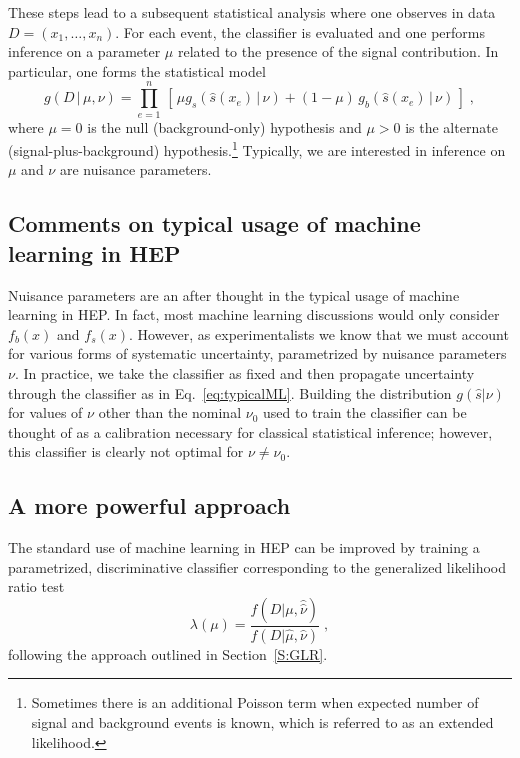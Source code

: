 \documentclass[11pt, oneside]{article}   	%
\begin{document}
These steps lead to a subsequent statistical analysis where one observes in data $D=(x_1, \dots, x_n)$. For each event, the classifier is evaluated and one performs inference on a parameter $\mu$ related to the presence of the signal contribution. In particular, one forms the statistical model
\begin{equation}\label{eq:typicalML}
g( D \,|\, \mu, \nu) = \prod_{e=1}^n \, \left[\, \mu g_s( \hat s(x_e) \, |\,  \nu)  + (1-\mu)\, g_b( \hat s(x_e) \,|\, \nu) \,\right] \; ,
\end{equation}
where $\mu=0$ is the null (background-only) hypothesis and $\mu>0$ is the alternate (signal-plus-background) hypothesis.\footnote{Sometimes there is an additional Poisson term when expected number of signal and background events is known, which is referred to as an extended likelihood.} Typically, we are interested in inference on $\mu$ and $\nu$ are nuisance parameters.

\subsection{Comments on typical usage of machine learning in HEP}

Nuisance parameters are an after thought in the typical usage of machine learning in HEP. In fact, most machine learning discussions would only consider $f_b(x)$ and $f_s(x)$. However, as experimentalists we know that we must account for various forms of systematic uncertainty, parametrized by nuisance parameters $\nu$. In practice, we take the classifier as fixed and then propagate uncertainty through the classifier as in Eq.~\ref{eq:typicalML}. Building the distribution $g(\hat s|\nu)$ for values of $\nu$ other than the nominal $\nu_0$ used to train the classifier can be thought of as a calibration necessary for classical statistical inference; however, this classifier is clearly not optimal for $\nu \ne \nu_0$.

\subsection{A more powerful  approach}

The standard use of machine learning in HEP can be improved by training a parametrized, discriminative classifier corresponding to the generalized likelihood ratio test 
\begin{equation}
\lambda(\mu) = \frac{f(D|\mu, \hat{\hat{\nu}})}{f(D|\hat \mu, {\hat{\nu}})} \;,
\end{equation}
following the approach outlined in Section~\ref{S:GLR}. 
\end{document}
